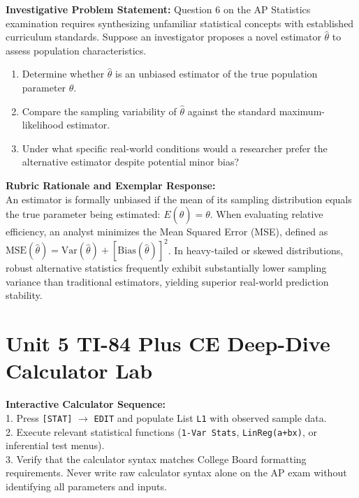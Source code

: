 \begin{frqrubricbox}
\textbf{Investigative Problem Statement:} Question 6 on the AP Statistics examination requires synthesizing unfamiliar statistical concepts with established curriculum standards. Suppose an investigator proposes a novel estimator $\hat{\theta}$ to assess population characteristics.
\begin{enumerate}[label=(\alph*)]
  \item Determine whether $\hat{\theta}$ is an unbiased estimator of the true population parameter $\theta$.
  \item Compare the sampling variability of $\hat{\theta}$ against the standard maximum-likelihood estimator.
  \item Under what specific real-world conditions would a researcher prefer the alternative estimator despite potential minor bias?
\end{enumerate}
\textbf{Rubric Rationale and Exemplar Response:}\\
An estimator is formally unbiased if the mean of its sampling distribution equals the true parameter being estimated: $E(\hat{\theta}) = \theta$. When evaluating relative efficiency, an analyst minimizes the Mean Squared Error (MSE), defined as $\text{MSE}(\hat{\theta}) = \text{Var}(\hat{\theta}) + [\text{Bias}(\hat{\theta})]^2$. In heavy-tailed or skewed distributions, robust alternative statistics frequently exhibit substantially lower sampling variance than traditional estimators, yielding superior real-world prediction stability.
\end{frqrubricbox}\vspace{6pt}
\section{Unit 5 TI-84 Plus CE Deep-Dive Calculator Lab}
\begin{calculatorbox}
\textbf{Interactive Calculator Sequence:}\\
1. Press \texttt{[STAT]} $\rightarrow$ \texttt{EDIT} and populate List \texttt{L1} with observed sample data.\\
2. Execute relevant statistical functions (\texttt{1-Var Stats}, \texttt{LinReg(a+bx)}, or inferential test menus).\\
3. Verify that the calculator syntax matches College Board formatting requirements. Never write raw calculator syntax alone on the AP exam without identifying all parameters and inputs.
\end{calculatorbox}\vspace{10pt}
